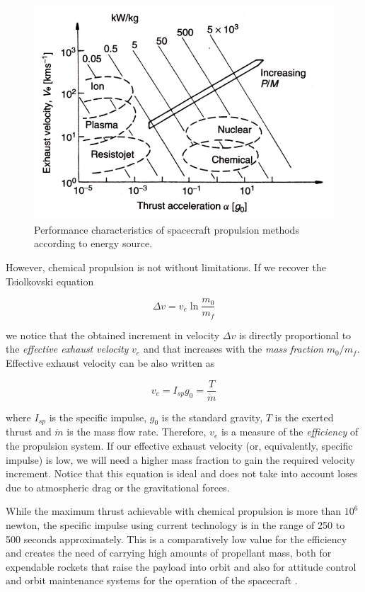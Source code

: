 \begin{figure}
\centering
\includegraphics[width=1.0\textwidth]{figures/propulsion-diagram.png}
\caption{Performance characteristics of spacecraft propulsion methods according to energy source.}
\label{fig:propulsionchart}
\end{figure}

However, chemical propulsion is not without limitations. If we recover the Tsiolkovski equation

\begin{equation}
\Delta v = v_e \ln \frac{m_0}{m_f}
\end{equation}

we notice that the obtained increment in velocity $\Delta v$ is directly proportional to the \textit{effective exhaust velocity} $v_e$ and that increases with the \textit{mass fraction} $m_0 / m_f$. Effective exhaust velocity can be also written as

\[
v_e = I_{sp} g_0 = \frac{T}{\dot{m}}
\]

where $I_{sp}$ is the specific impulse, $g_0$ is the standard gravity, $T$ is the exerted thrust and $\dot{m}$ is the mass flow rate. Therefore, $v_e$ is a measure of the \textit{efficiency} of the propulsion system. If our effective exhaust velocity (or, equivalently, specific impulse) is low, we will need a higher mass fraction to gain the required velocity increment. Notice that this equation is ideal and does not take into account loses due to atmospheric drag or the gravitational forces.

While the maximum thrust achievable with chemical propulsion is more than $10^6$ newton, the specific impulse using current technology is in the range of 250 to 500 seconds approximately. This is a comparatively low value for the efficiency and creates the need of carrying high amounts of propellant mass, both for expendable rockets that raise the payload into orbit and also for attitude control and orbit maintenance systems for the operation of the spacecraft \cite{curran1993nasa}.

